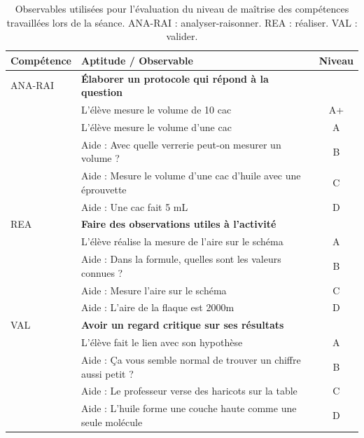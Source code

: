 \documentclass[12pt,a4paper, fleqn]{report}
\newcommand{\rea}{\colorbox{yellow_c}{\textcolor{yellow_f}{REA}}}
\newcommand{\anarai}{\colorbox{green_c}{\textcolor{green_f}{ANA-RAI}}}
\newcommand{\val}{\colorbox{orange_c}{\textcolor{orange_f}{VAL}}}
\begin{document}
\begin{table}[htbp]
\center
\begin{tabular}{l|l|c}
\textbf{Compétence} & \textbf{Aptitude} / Observable & \textbf{Niveau} \\
\hline \hline
\anarai 	& \textbf{Élaborer un protocole qui répond à la question} 	& \\
				& L'élève mesure le volume de 10 cac				 						& A+ \\
				& L'élève mesure le volume d'une cac 									& A \\
				& Aide : Avec quelle verrerie peut-on mesurer un volume ?	& B \\
				& Aide : Mesure le volume d'une cac d'huile avec une éprouvette & C \\
				& Aide : Une cac fait 5 mL 															& D \\
\hline
\rea			& \textbf{Faire des observations utiles à l'activité}					& \\
				& L'élève réalise la mesure de l'aire sur le schéma				& A \\
				& Aide : Dans la formule, quelles sont les valeurs connues ? & B \\
				& Aide : Mesure l'aire sur le schéma											& C \\
				& Aide : L'aire de la flaque est \unit{2000}{m\squared}			& D \\
\hline
\val			& \textbf{Avoir un regard critique sur ses résultats}				& \\
				& L'élève fait le lien avec son hypothèse									& A \\
				& Aide : Ça vous semble normal de trouver un chiffre aussi petit ? & B \\
				& Aide : Le professeur verse des haricots sur la table			& C \\
				& Aide : L'huile forme une couche haute comme une seule molécule & D \\
\end{tabular}
\caption{Observables utilisées pour l'évaluation du niveau de maîtrise des compétences travaillées lors de la séance.
\anarai{} : analyser-raisonner.
\rea{} : réaliser.
\val{} : valider.}
\label{tab:cptces_tp}
\end{table}
\end{document}
